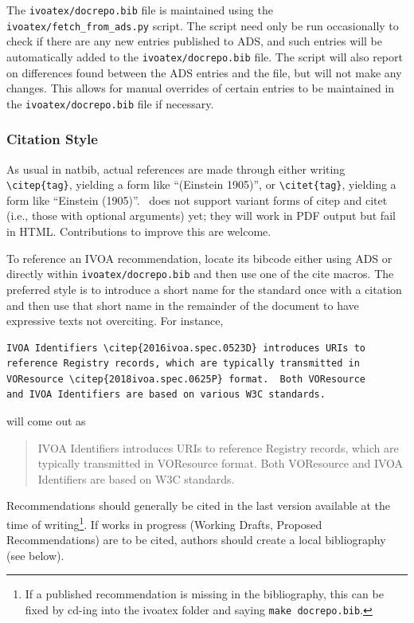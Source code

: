 \documentclass[11pt,a4paper]{ivoa}
\begin{document}
The \texttt{ivoatex/docrepo.bib} file is maintained using the
\texttt{ivoatex/fetch_from_ads.py} script. The script need only be run
occasionally to check if there are any new entries published to ADS,
and such entries will be automatically added to the \texttt{ivoatex/docrepo.bib}
file. The script will also report on differences found between the ADS
entries and the file, but will not make any changes. This allows for
manual overrides of certain entries to be maintained in the
\texttt{ivoatex/docrepo.bib} file if necessary.

\subsubsection{Citation Style}
\label{sect:citation}

As usual in natbib, actual references are made through either writing
\verb|\citep{tag}|, yielding a form like ``(Einstein 1905)'',
or \verb|\citet{tag}|, yielding a form like ``Einstein (1905)''.
\ivoatex\ does not support variant forms of citep and citet (i.e., those
with optional arguments) yet; they will work in PDF output but fail in
HTML.  Contributions to improve this are welcome.

To reference an IVOA recommendation, locate its bibcode either using ADS
or directly within \texttt{ivoatex/docrepo.bib} and then use one of the
cite macros.  The preferred style is to introduce a short name for the
standard once with a citation and then use that short name in the
remainder of the document to have expressive texts not overciting. For
instance,

\begin{lstlisting}
IVOA Identifiers \citep{2016ivoa.spec.0523D} introduces URIs to
reference Registry records, which are typically transmitted in
VOResource \citep{2018ivoa.spec.0625P} format.  Both VOResource
and IVOA Identifiers are based on various W3C standards.
\end{lstlisting}

will come out as

\begin{quotation}
IVOA Identifiers \citep{2016ivoa.spec.0523D} introduces URIs to
reference Registry records, which are typically transmitted in
VOResource \citep{2018ivoa.spec.0625P} format.  Both VOResource and IVOA
Identifiers are based on W3C standards.
\end{quotation}

Recommendations should generally be cited in the last version available
at the time of writing\footnote{If a published recommendation is missing
in the bibliography, this can be fixed by cd-ing into the ivoatex folder
and saying \texttt{make docrepo.bib}.}.  If works in progress (Working
Drafts, Proposed Recommendations) are to be cited, authors should create
a local bibliography (see below).
\end{document}
